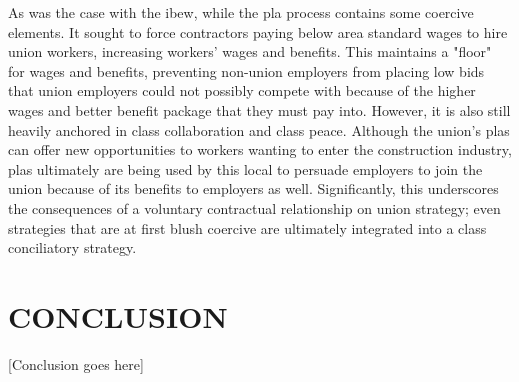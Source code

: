 \documentclass[12pt]{article}
\begin{document}
As was the case with the \acrshort{ibew}, while the \acrshort{pla} process contains some coercive elements. It sought to force contractors paying below area standard wages to hire union workers, increasing workers' wages and benefits. This maintains a "floor" for wages and benefits, preventing non-union employers from placing low bids that union employers could not possibly compete with because of the higher wages and better benefit package that they must pay into. However, it is also still heavily anchored in class collaboration and class peace. Although the union's \acrshort{pla}s can offer new opportunities to workers wanting to enter the construction industry, \acrshort{pla}s ultimately are being used by this local to persuade employers to join the union because of its benefits to employers as well. Significantly, this underscores the consequences of a voluntary contractual relationship on union strategy; even strategies that are at first blush coercive are ultimately integrated into a class conciliatory strategy.

\section{CONCLUSION}

{\color{red}[Conclusion goes here]}



\clearpage
\titleformat{\section}{\fontsize{12}{14}\bfseries\centering}{\thesection}{0.5em}{}
\sloppy
\printbibliography[heading=bibintoc]%

\clearpage
\end{document}

